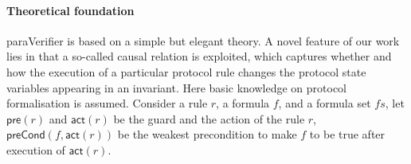 \documentclass{llncs}
\begin{document}
\paragraph{Theoretical foundation}  {\sf paraVerifier} is based on a simple but elegant theory.  %
A novel feature of our work lies in that a so-called causal
relation is exploited, which captures whether and how the execution of a particular protocol rule changes the protocol state variables appearing in an invariant. Here  basic knowledge on protocol formalisation is assumed. Consider a rule $r$, a formula $f$, and a formula set $fs$, let $\mathsf{pre}(r)$ and $\mathsf{act}( r)$ be the guard and the action of the rule $r$, $\mathsf{preCond}( f,\mathsf{act}( r))$ be the weakest precondition to make $f$ to be true after execution of $\mathsf{act}( r)$. %
\end{document}
